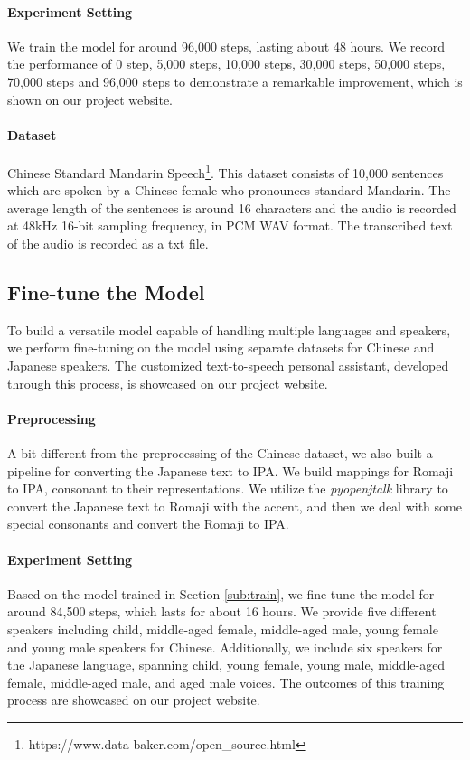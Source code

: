 \documentclass{article}
\begin{document}
\paragraph{Experiment Setting}
We train the model for around 96,000 steps, lasting about 48 hours. We record the performance of 0 step, 5,000 steps, 10,000 steps, 30,000 steps, 50,000 steps, 70,000 steps and 96,000 steps to demonstrate a remarkable improvement, which is shown on our project website.

\paragraph{Dataset} Chinese Standard Mandarin Speech\footnote{https://www.data-baker.com/open\_source.html}. This dataset consists of 10,000 sentences which are spoken by a Chinese female who pronounces standard Mandarin. The average length of the sentences is around 16 characters and the audio is recorded at 48kHz 16-bit sampling frequency, in PCM WAV format. The transcribed text of the audio is recorded as a txt file.


\subsection{Fine-tune the Model}
To build a versatile model capable of handling multiple languages and speakers, we perform fine-tuning on the model using separate datasets for Chinese and Japanese speakers. The customized text-to-speech personal assistant, developed through this process, is showcased on our project website.
\paragraph{Preprocessing}
A bit different from the preprocessing of the Chinese dataset, we also built a pipeline for converting the Japanese text to IPA. We build mappings for Romaji to IPA, consonant to their representations. We utilize the \textit{pyopenjtalk} library to convert the Japanese text to Romaji with the accent, and then we deal with some special consonants and convert the Romaji to IPA.

\paragraph{Experiment Setting}
Based on the model trained in Section \ref{sub:train}, we fine-tune the model for around 84,500 steps, which lasts for about 16 hours. We provide five different speakers including child, middle-aged female, middle-aged male, young female and young male speakers for Chinese. Additionally, we include six speakers for the Japanese language, spanning child, young female, young male, middle-aged female, middle-aged male, and aged male voices. The outcomes of this training process are showcased on our project website.
\end{document}
